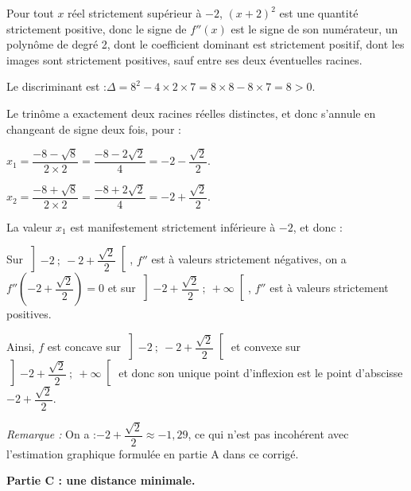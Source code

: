 \begin{enumerate}
Pour tout $x$ réel strictement supérieur à $-2$, $(x+2)^2$ est une quantité strictement positive, donc le signe de $f''(x)$ est le signe de son numérateur, un polynôme de degré 2, dont le coefficient dominant est strictement positif, dont les images sont strictement positives, sauf entre ses deux éventuelles racines.

Le discriminant est :\quad $\Delta = 8^2 - 4\times 2 \times 7 = 8\times 8- 8\times 7 = 8>0$.

Le trinôme a exactement deux racines réelles distinctes, et donc s'annule en changeant de signe deux fois, pour :

$x_1 = \dfrac{-8 - \sqrt{8}}{2\times 2} = \dfrac{-8 - 2\sqrt{2}}{4} = -2 - \dfrac{\sqrt{2}}{2}$.

$x_2 = \dfrac{-8 + \sqrt{8}}{2\times 2} = \dfrac{-8 + 2\sqrt{2}}{4} = -2 + \dfrac{\sqrt{2}}{2}$.

La valeur $x_1$ est manifestement strictement inférieure à $-2$, et donc :

Sur $ \left]-2~;~-2 + \dfrac{\sqrt{2}}{2}\right[ $, $f''$ est à valeurs strictement négatives, on a $f''\left(-2 + \dfrac{\sqrt{2}}{2}\right) =0$ et sur $\left]-2 + \dfrac{\sqrt{2}}{2}~;~+\infty\right[$, $f''$ est à valeurs strictement positives.

Ainsi, $f$ est concave sur $\left]-2~;~-2 + \dfrac{\sqrt{2}}{2}\right[$ et convexe sur $\left]-2 + \dfrac{\sqrt{2}}{2}~;~+\infty\right[$ et donc son unique point d'inflexion est le point d'abscisse $-2 + \dfrac{\sqrt{2}}{2}$.

\emph{Remarque :} On a :\quad$ -2 + \dfrac{\sqrt{2}}{2}\approx-1,29$, ce qui n'est pas incohérent avec l'estimation graphique formulée en partie A dans ce corrigé.

\end{enumerate}


\textbf{Partie C : une distance minimale.}

\medskip

